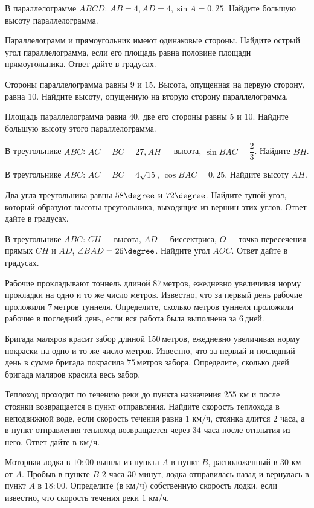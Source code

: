 \begin{homework}[number=1]
	\begin{listofex}
		\item В параллелограмме \(ABCD\): \(AB=4, AD=4, \sin A = 0,25 \).  Найдите большую высоту параллелограмма.
		\item Параллелограмм и прямоугольник имеют одинаковые стороны. Найдите острый угол параллелограмма, если его площадь равна половине площади прямоугольника. Ответ дайте в градусах.
		\item Стороны параллелограмма равны \(9\) и \(15\). Высота, опущенная на первую сторону, равна \(10\). Найдите высоту, опущенную на вторую сторону параллелограмма.
		\item Площадь параллелограмма равна \(40\), две его стороны равны \(5\) и \(10\). Найдите большую высоту этого параллелограмма.
		
		\item В треугольнике \(ABC\): \(AC=BC=27, AH\) --- высота, \(\sin BAC = \dfrac{ 2 }{ 3 }\). Найдите \(BH\).
		\item В треугольнике \(ABC\): \(AC = BC = 4\sqrt{15} \), \(\cos BAC = 0,25\). Найдите высоту \(AH\).
		\item Два угла треугольника равны \(58 \degree\) и \(72\degree \). Найдите тупой угол, который образуют высоты треугольника, выходящие из вершин этих углов. Ответ дайте в градусах.
		\item В треугольнике \(ABC\): \(CH\) --- высота, \(AD\) --- биссектриса, \(O\) --- точка пересечения прямых \(CH\) и \(AD\), \(\angle BAD = 26 \degree\). Найдите угол \(AOC\). Ответ дайте в градусах.
		\item Рабочие прокладывают тоннель длиной \(87\) метров, ежедневно увеличивая норму прокладки на одно и то же число метров. Известно, что за первый день рабочие проложили \(7\) метров туннеля. Определите, сколько метров туннеля проложили рабочие в последний день, если вся работа была выполнена за \(6\) дней.
		\item Бригада маляров красит забор длиной \(150\) метров, ежедневно увеличивая норму покраски на одно и то же число метров. Известно, что за первый и последний день в сумме бригада покрасила \(75\) метров забора. Определите, сколько дней бригада маляров красила весь забор.
		\item Теплоход проходит по течению реки до пункта назначения \(255\) км и после стоянки возвращается в пункт отправления. Найдите скорость теплохода в неподвижной воде, если скорость течения равна \(1\) км/ч, стоянка длится \(2\) часа, а в пункт отправления теплоход возвращается через \(34\) часа после отплытия из него. Ответ дайте в км/ч.
		\item Моторная лодка в \(10:00\) вышла из пункта \(A\) в пункт \(B\), расположенный в \(30\) км от \(A\). Пробыв в пункте \(B\) \(2\) часа \(30\) минут, лодка отправилась назад и вернулась в пункт \(A\) в \(18:00\). Определите (в км/ч) собственную скорость лодки, если известно, что скорость течения реки \(1\) км/ч.
	\end{listofex}
\end{homework}

